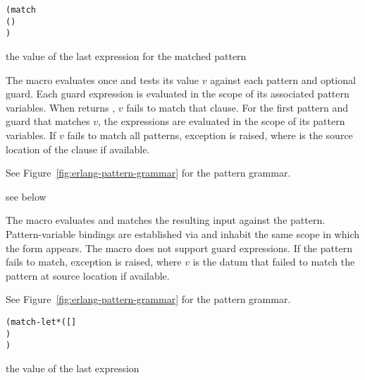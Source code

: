 \begin{syntax}\begin{alltt}
(match 
  (    \etc{})
  \etc{})\strut\end{alltt}
\end{syntax}
\returns{} the value of the last expression   \etc{}
for the matched pattern

The  macro evaluates  once and tests its value
$v$ against each pattern and optional guard.  Each guard expression
 is evaluated in the scope of its associated pattern
variables. When  returns , $v$ fails to match that
clause.  For the first pattern and guard that matches $v$, the
expressions   \etc{} are evaluated in the scope of its
pattern variables. If $v$ fails to match all patterns, exception
 is raised, where  is the
source location of the  clause if available.

See Figure~\ref{fig:erlang-pattern-grammar} for the pattern grammar.

\begin{syntax}
\end{syntax}
\expandsto{} see below

The  macro evaluates  and matches the resulting
input against the pattern.
Pattern-variable bindings are established via  and inhabit the
same scope in which the  form appears.
The  macro does not support guard expressions.
If the pattern fails to match, exception
 is raised, where $v$ is the datum
that failed to match the pattern at source location 
if available.

See Figure~\ref{fig:erlang-pattern-grammar} for the pattern grammar.

\begin{syntax}\begin{alltt}
(match-let* ([  ]
             \etc{})
    \etc{})\strut\end{alltt}
\end{syntax}
\returns{} the value of the last expression   \etc{}

